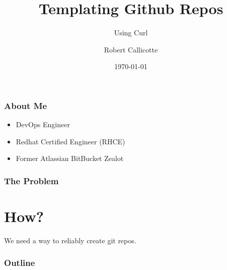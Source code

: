 \documentclass{beamer}
\title{Templating Github Repos}
\subtitle{Using Curl}
\author{Robert Callicotte}
\institute{EOG Resources}
\date{\today}
\begin{document}
  \begin{frame}
    \titlepage
  \end{frame}

  \begin{frame}
    \frametitle{About Me}
      \begin{itemize}
        \item{DevOps Engineer}
        \item{Redhat Certified Engineer (RHCE)}
        \item{Former Atlassian BitBucket Zealot}
      \end{itemize}
  \end{frame} 

  \begin{frame}
    \frametitle{The Problem}
    \section{How?}
    We need a way to reliably create git repos.
  \end{frame}

  \begin{frame}
  \frametitle{Outline}
  \tableofcontents
  \end{frame}
\end{document}
